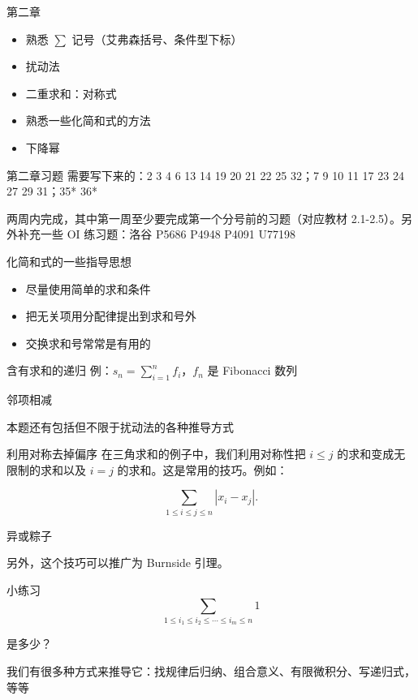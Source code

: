 \begin{frame}{第二章}
    \begin{itemize}
        \item 熟悉 $\displaystyle\sum$ 记号（艾弗森括号、条件型下标）
        \item 扰动法
        \item 二重求和：对称式
        \item 熟悉一些化简和式的方法
        \item 下降幂
    \end{itemize}
\end{frame}
\begin{frame}{第二章习题}
    需要写下来的：2 3 4 6 13 14 19 20 21 22 25 32；7 9 10 11 17 23 24 27 29 31；35* 36*

    两周内完成，其中第一周至少要完成第一个分号前的习题（对应教材 2.1-2.5）。另外补充一些 OI 练习题：洛谷 P5686 P4948 P4091 U77198
\end{frame}
\begin{frame}{化简和式的一些指导思想}
    \begin{itemize}
        \item 尽量使用简单的求和条件
        \item 把无关项用分配律提出到求和号外
        \item 交换求和号常常是有用的
    \end{itemize}
\end{frame}
\begin{frame}{含有求和的递归}
    例：$s_n=\sum_{i=1}^n f_i$，$f_n$ 是 Fibonacci 数列

    邻项相减

    本题还有包括但不限于扰动法的各种推导方式
\end{frame}
\begin{frame}{利用对称去掉偏序}
    在三角求和的例子中，我们利用对称性把 $i\le j$ 的求和变成无限制的求和以及 $i=j$ 的求和。这是常用的技巧。例如：

    $$
    \sum_{1\le i\le j\le n}|x_i-x_j|.
    $$

    异或粽子

    另外，这个技巧可以推广为 Burnside 引理。
\end{frame}
\begin{frame}{小练习}
    $$
    \sum_{1\le i_1\le i_2\le\cdots\le i_m\le n} 1
    $$

    是多少？

    我们有很多种方式来推导它：找规律后归纳、组合意义、有限微积分、写递归式，等等
\end{frame}
